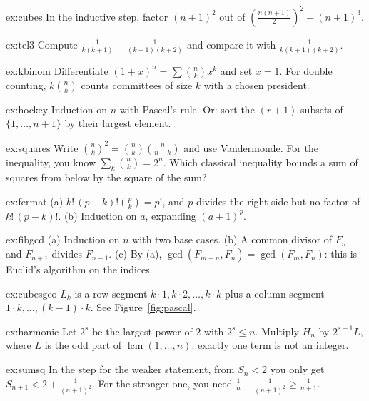 \begin{hint}{ex:cubes}
In the inductive step, factor $(n+1)^2$ out of $\left(\frac{n(n+1)}2\right)^2+(n+1)^3$.
\end{hint}
\begin{hint}{ex:tel3}
Compute $\frac1{k(k+1)}-\frac1{(k+1)(k+2)}$ and compare it with $\frac1{k(k+1)(k+2)}$.
\end{hint}
\begin{hint}{ex:kbinom}
Differentiate $(1+x)^n=\sum\binom nkx^k$ and set $x=1$. For double counting, $k\binom nk$ counts committees of size $k$ with a chosen president.
\end{hint}
\begin{hint}{ex:hockey}
Induction on $n$ with Pascal's rule. Or: sort the $(r+1)$-subsets of $\{1,\dots,n+1\}$ by their largest element.
\end{hint}
\begin{hint}{ex:squares}
Write $\binom nk^2=\binom nk\binom n{n-k}$ and use Vandermonde. For the inequality, you know $\sum_k\binom nk=2^n$. Which classical inequality bounds a sum of squares from below by the square of the sum?
\end{hint}
\begin{hint}{ex:fermat}
(a) $k!\,(p-k)!\binom pk=p!$, and $p$ divides the right side but no factor of $k!\,(p-k)!$. (b) Induction on $a$, expanding $(a+1)^p$.
\end{hint}
\begin{hint}{ex:fibgcd}
(a) Induction on $n$ with two base cases. (b) A common divisor of $F_n$ and $F_{n+1}$ divides $F_{n-1}$. (c) By (a), $\gcd(F_{m+n},F_n)=\gcd(F_m,F_n)$: this is Euclid's algorithm on the indices.
\end{hint}
\begin{hint}{ex:cubesgeo}
$L_k$ is a row segment $k\cdot1,k\cdot2,\dots,k\cdot k$ plus a column segment $1\cdot k,\dots,(k-1)\cdot k$. See Figure~\ref{fig:pascal}.
\end{hint}
\begin{hint}{ex:harmonic}
Let $2^s$ be the largest power of $2$ with $2^s\le n$. Multiply $H_n$ by $2^{s-1}L$, where $L$ is the odd part of $\operatorname{lcm}(1,\dots,n)$: exactly one term is not an integer.
\end{hint}
\begin{hint}{ex:sumsq}
In the step for the weaker statement, from $S_n<2$ you only get $S_{n+1}<2+\frac1{(n+1)^2}$. For the stronger one, you need $\frac1n-\frac1{(n+1)^2}\ge\frac1{n+1}$.
\end{hint}
